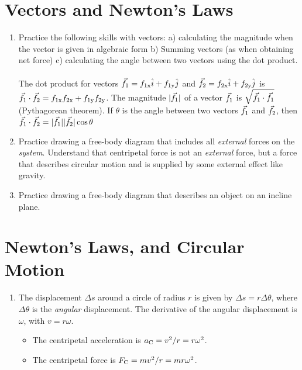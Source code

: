 \documentclass[10pt]{article}
\begin{document}
\maketitle

\section{Vectors and Newton's Laws}
\begin{enumerate}
\item Practice the following skills with vectors: a) calculating the magnitude when the vector is given in algebraic form b) Summing vectors (as when obtaining net force) c) calculating the angle between two vectors using the dot product. \\ \\
The dot product for vectors $\vec{f}_{\rm 1} = f_{\rm 1x}\hat{i} + f_{\rm 1y}\hat{j}$ and $\vec{f}_{\rm 2} = f_{\rm 2x}\hat{i} + f_{\rm 2y}\hat{j}$ is $\vec{f}_{\rm 1} \cdot \vec{f}_{\rm 2} = f_{\rm 1x}f_{\rm 2x} + f_{\rm 1y}f_{\rm 2y}$.  The magnitude $|\vec{f}_{\rm 1}|$ of a vector $\vec{f}_{\rm 1}$ is $\sqrt{\vec{f}_{\rm 1}\cdot\vec{f}_{\rm 1}}$ (Pythagorean theorem).  If $\theta$ is the angle between two vectors $\vec{f}_{\rm 1}$ and $\vec{f}_{\rm 2}$, then $\vec{f}_{\rm 1} \cdot \vec{f}_{\rm 2} = |\vec{f}_{\rm 1}||\vec{f}_{\rm 2}|\cos\theta$
\item Practice drawing a free-body diagram that includes all \textit{external} forces on the \textit{system}.  Understand that centripetal force is not an \textit{external} force, but a force that describes circular motion and is supplied by some external effect like gravity.
\item Practice drawing a free-body diagram that describes an object on an incline plane.
\end{enumerate}
\section{Newton's Laws, and Circular Motion}
\begin{enumerate}
\item The displacement $\Delta s$ around a circle of radius $r$ is given by $\Delta s = r\Delta\theta$, where $\Delta\theta$ is the \textit{angular} displacement.  The derivative of the angular displacement is $\omega$, with $v = r\omega$.
\begin{itemize}
\item The centripetal acceleration is $a_{\rm C} = v^2/r = r\omega^2$.
\item The centripetal force is $F_{\rm C} = mv^2/r = mr\omega^2$.
\end{itemize} 
\end{enumerate}
\end{document}
